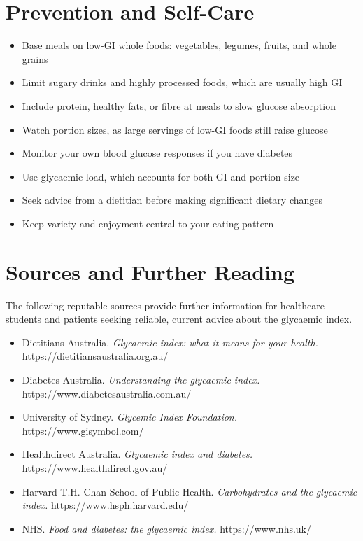 \section*{Prevention and Self-Care}
\begin{itemize}
    \item Base meals on low-GI whole foods: vegetables, legumes, fruits, and whole grains
    \item Limit sugary drinks and highly processed foods, which are usually high GI
    \item Include protein, healthy fats, or fibre at meals to slow glucose absorption
    \item Watch portion sizes, as large servings of low-GI foods still raise glucose
    \item Monitor your own blood glucose responses if you have diabetes
    \item Use glycaemic load, which accounts for both GI and portion size
    \item Seek advice from a dietitian before making significant dietary changes
    \item Keep variety and enjoyment central to your eating pattern
\end{itemize}

\section*{Sources and Further Reading}
The following reputable sources provide further information for healthcare students and patients seeking reliable, current advice about the glycaemic index.

\begin{itemize}
    \item Dietitians Australia. \textit{Glycaemic index: what it means for your health.} https://dietitiansaustralia.org.au/
    \item Diabetes Australia. \textit{Understanding the glycaemic index.} https://www.diabetesaustralia.com.au/
    \item University of Sydney. \textit{Glycemic Index Foundation.} https://www.gisymbol.com/
    \item Healthdirect Australia. \textit{Glycaemic index and diabetes.} https://www.healthdirect.gov.au/
    \item Harvard T.H. Chan School of Public Health. \textit{Carbohydrates and the glycaemic index.} https://www.hsph.harvard.edu/
    \item NHS. \textit{Food and diabetes: the glycaemic index.} https://www.nhs.uk/
\end{itemize}
